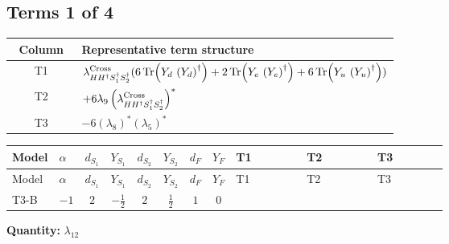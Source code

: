 \documentclass[8pt]{article}
\begin{document}
\begin{landscape}
\subsection*{Terms 1 of 4}
\begin{center}
\begin{tabular}{@{}c >{\raggedright\arraybackslash}p{0.82\linewidth}@{}}
\toprule
Column & Representative term structure \\
\midrule
T1 & \(\displaystyle {\lambda_{H H^\dagger S_1^\dagger S_2^\dagger}^{\rm Cross}} (6 \operatorname{Tr}\!\left({Y_d}\,\left({Y_d}\right)^{\dagger}\right)+2 \operatorname{Tr}\!\left({Y_e}\,\left({Y_e}\right)^{\dagger}\right)+6 \operatorname{Tr}\!\left({Y_u}\,\left({Y_u}\right)^{\dagger}\right))\) \\
\midrule
T2 & \(\displaystyle +6 {\lambda_9} \left({\lambda_{H H^\dagger S_1^\dagger S_2^\dagger}^{\rm Cross}}\right)^{*}\) \\
\midrule
T3 & \(\displaystyle -6 \left({\lambda_8}\right)^{*} \left({\lambda_5}\right)^{*}\) \\
\midrule
\bottomrule
\end{tabular}
\end{center}
\smallskip
\tiny
\begin{longtable}{@{}llcccccc >{\raggedright\arraybackslash}p{0.21\linewidth} >{\raggedright\arraybackslash}p{0.21\linewidth} >{\raggedright\arraybackslash}p{0.21\linewidth}@{}}
\toprule
Model & $\alpha$ & $d_{S_1}$ & $Y_{S_1}$ & $d_{S_2}$ & $Y_{S_2}$ & $d_F$ & $Y_F$ & T1 & T2 & T3 \\
\midrule
\endfirsthead
\toprule
Model & $\alpha$ & $d_{S_1}$ & $Y_{S_1}$ & $d_{S_2}$ & $Y_{S_2}$ & $d_F$ & $Y_F$ & T1 & T2 & T3 \\
\midrule
\endhead
T3-B & $-1$ & $2$ & $-\frac{1}{2}$ & $2$ & $\frac{1}{2}$ & $1$ & $0$ & \scriptsize\adjustbox{max width=\linewidth}{$\begin{gathered} {\lambda_{H H^\dagger S_1^\dagger S_2^\dagger}^{\rm Cross}} (6 \operatorname{Tr}\!\left({Y_d}\,\left({Y_d}\right)^{\dagger}\right)+2 \operatorname{Tr}\!\left({Y_e}\,\left({Y_e}\right)^{\dagger}\right)+6 \operatorname{Tr}\!\left({Y_u}\,\left({Y_u}\right)^{\dagger}\right))\end{gathered}$} & \scriptsize\adjustbox{max width=\linewidth}{$\begin{gathered} +6 {\lambda_9} \left({\lambda_{H H^\dagger S_1^\dagger S_2^\dagger}^{\rm Cross}}\right)^{*}\end{gathered}$} & \scriptsize\adjustbox{max width=\linewidth}{$\begin{gathered} -6 \left({\lambda_8}\right)^{*} \left({\lambda_5}\right)^{*}\end{gathered}$} \\
\midrule
\bottomrule
\end{longtable}
\clearpage
\noindent\textbf{Quantity: }$\lambda_{12}$\par\smallskip

\end{landscape}
\end{document}

